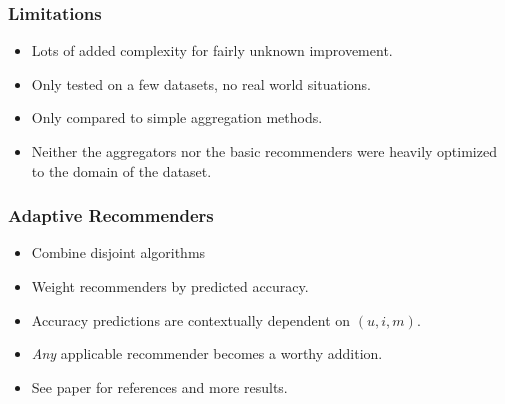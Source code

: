 \documentclass[screen]{beamer}
\begin{document}
\begin{frame}
  \frametitle{Limitations}
  \begin{itemize}
    \item Lots of added complexity for fairly unknown improvement.
    \item Only tested on a few datasets, no real world situations.
    \item Only compared to simple aggregation methods.
    \item Neither the aggregators nor the basic recommenders were
      heavily optimized to the domain of the dataset.
  \end{itemize}
\end{frame}

\begin{frame}
  \frametitle{Adaptive Recommenders}
  \begin{itemize}
    \item Combine disjoint algorithms
    \item Weight recommenders by predicted accuracy.
    \item Accuracy predictions are contextually dependent on $(u,i,m)$.
    \item \emph{Any} applicable recommender becomes a worthy addition.
    \item See paper for references and more results.
  \end{itemize}
\end{frame}
\end{document}
